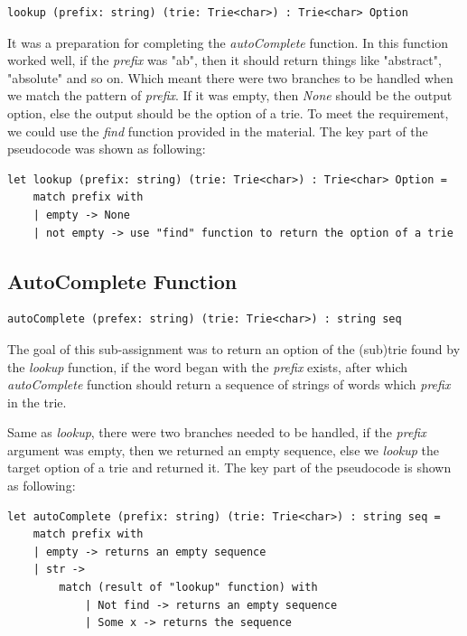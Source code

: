 \documentclass{article}
\begin{document}
\begin{lstlisting}
lookup (prefix: string) (trie: Trie<char>) : Trie<char> Option
\end{lstlisting}

It was a preparation for completing the \emph{autoComplete} function. In this function worked well, if the \emph{prefix} was "ab", then it should return things like "abstract", "absolute" and so on. Which meant there were two branches to be handled when we match the pattern of \emph{prefix}. If it was empty, then \emph{None} should be the output option, else the output should be the option of a trie. To meet the requirement, we could use the \emph{find} function provided in the material. The key part of the pseudocode was shown as following:

\begin{lstlisting}
let lookup (prefix: string) (trie: Trie<char>) : Trie<char> Option = 
    match prefix with
    | empty -> None
    | not empty -> use "find" function to return the option of a trie
\end{lstlisting}

\subsection{AutoComplete Function}\label{sec:autocomplete}
\begin{lstlisting}
autoComplete (prefex: string) (trie: Trie<char>) : string seq
\end{lstlisting}

The goal of this sub-assignment was to return an option of the (sub)trie found by the \emph{lookup} function, if the word began with the \emph{prefix} exists, after which \emph{autoComplete} function should return a sequence of strings of words which \emph{prefix} in the trie.

Same as \emph{lookup}, there were two branches needed to be handled, if the \emph{prefix} argument was empty, then we returned an empty sequence, else we \emph{lookup} the target option of a trie and returned it. The key part of the pseudocode is shown as following:

\begin{lstlisting}
let autoComplete (prefix: string) (trie: Trie<char>) : string seq = 
    match prefix with
    | empty -> returns an empty sequence
    | str -> 
        match (result of "lookup" function) with
            | Not find -> returns an empty sequence
            | Some x -> returns the sequence
\end{lstlisting}
\end{document}
